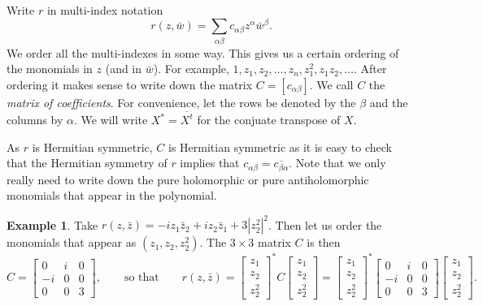 \documentclass[12pt,openany]{book}
\newcommand{\abs}[1]{\left\lvert {#1} \right\rvert}
\newcommand{\myindex}[1]{#1\index{#1}}
\theoremstyle{plain}
\theoremstyle{remark}
\theoremstyle{definition}
\theoremstyle{exercise}
\theoremstyle{example}
\newtheorem{example}[thm]{Example}
\begin{document}
Write $r$ in multi-index notation
\begin{equation*}
r(z,\bar{w}) = \sum_{\alpha \beta} c_{\alpha \beta} z^\alpha \bar{w}^\beta .
\end{equation*}
We order all the multi-indexes in some way.  This gives us
a certain ordering of the monomials in $z$ (and in $\bar{w}$).
For example, $1,z_1,z_2,\ldots,z_n,
z_1^2,z_1z_2,\ldots$.  After ordering it makes sense to write down the
matrix
$C = [ c_{\alpha \beta} ]$.  We call $C$ the \emph{\myindex{matrix of
coefficients}}.  For convenience, let the rows be denoted by the $\beta$
and the columns by $\alpha$.  We will write $X^* = \overline{X^t}$ for the
conjuate transpose of $X$.

As $r$ is Hermitian symmetric, $C$
is Hermitian symmetric as it is easy to check that the
Hermitian symmetry of $r$ implies that $c_{\alpha\beta} =
\overline{c_{\beta \alpha}}$.
Note that we only really need to write down the pure holomorphic or pure
antiholomorphic monomials that appear in the
polynomial.

\begin{example}
Take $r(z,\bar{z}) = -i z_1 \bar{z}_2 + i z_2 \bar{z}_1 + 3 \abs{z_2^2}^2$.
Then let us order the monomials that appear as $(z_1,z_2,z_2^2)$.  The $3
\times 3$ matrix $C$ is then
\begin{equation}
C = 
\begin{bmatrix}
0  & i & 0 \\
-i & 0 & 0 \\
0  & 0 & 3
\end{bmatrix} ,
\qquad
\text{so that}
\qquad
r(z,\bar{z}) = 
\begin{bmatrix}
z_1 \\ z_2 \\ z_2^2
\end{bmatrix}^*
C
\begin{bmatrix}
z_1 \\ z_2 \\ z_2^2
\end{bmatrix}
=
\begin{bmatrix}
z_1 \\ z_2 \\ z_2^2
\end{bmatrix}^*
\begin{bmatrix}
0  & i & 0 \\
-i & 0 & 0 \\
0  & 0 & 3
\end{bmatrix} 
\begin{bmatrix}
z_1 \\ z_2 \\ z_2^2
\end{bmatrix} .
\end{equation}
\end{example}
\end{document}
